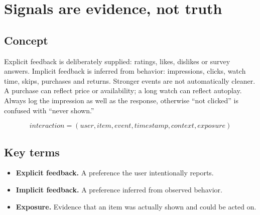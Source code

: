 \section{Signals are evidence, not truth}

\begin{abstract}
A click is evidence of interest, but it is also shaped by what was exposed and where.
\end{abstract}

\subsection{Concept}
Explicit feedback is deliberately supplied: ratings, likes, dislikes or survey answers. Implicit feedback is inferred from behavior: impressions, clicks, watch time, skips, purchases and returns. Stronger events are not automatically cleaner. A purchase can reflect price or availability; a long watch can reflect autoplay. Always log the impression as well as the response, otherwise “not clicked” is confused with “never shown.”

\begin{equation*}
interaction = (user, item, event, timestamp, context, exposure)
\end{equation*}

\subsection{Key terms}
\begin{itemize}
\item \textbf{Explicit feedback.} A preference the user intentionally reports.
\item \textbf{Implicit feedback.} A preference inferred from observed behavior.
\item \textbf{Exposure.} Evidence that an item was actually shown and could be acted on.
\end{itemize}
